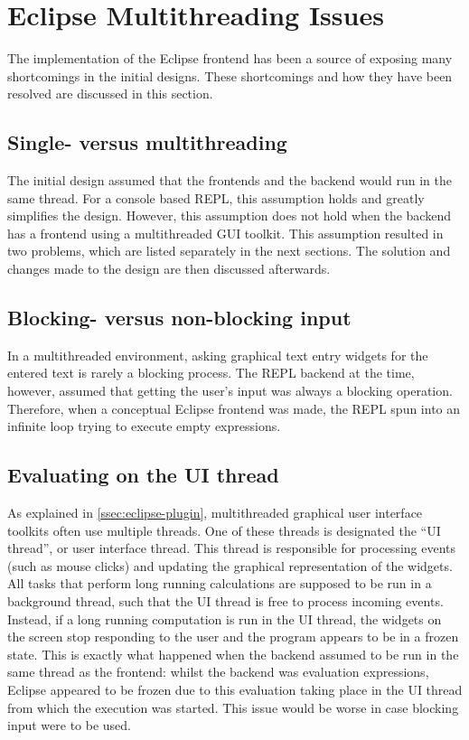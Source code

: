 \section{Eclipse Multithreading Issues}
\label{sec:eclipse-multithread}

The implementation of the Eclipse frontend has been a source of exposing many
shortcomings in the initial designs. These shortcomings and how they have been
resolved are discussed in this section.

\subsection{Single- versus multithreading}

The initial design assumed that the frontends and the backend would run in the
same thread. For a console based REPL, this assumption holds and greatly
simplifies the design. However, this assumption does not hold when the backend
has a frontend using a multithreaded GUI toolkit. This
assumption resulted in two problems, which are listed separately in the next
sections. The solution and changes made to the design are then discussed
afterwards.

\subsection{Blocking- versus non-blocking input}

In a multithreaded environment, asking graphical text entry widgets for the
entered text is rarely a blocking process. The REPL backend at the time,
however, assumed that getting the user's input was always a blocking operation.
Therefore, when a conceptual Eclipse frontend was made, the REPL spun into an
infinite loop trying to execute empty expressions.

\subsection{Evaluating on the UI thread}

As explained in \cref{ssec:eclipse-plugin}, multithreaded graphical user
interface toolkits often use multiple threads. One of these threads is
designated the ``UI thread'', or user interface thread. This thread is
responsible for processing events (such as mouse clicks) and updating the
graphical representation of the widgets. All tasks that perform long running
calculations are supposed to be run in a background thread, such that the UI
thread is free to process incoming events. Instead, if a long running
computation is run in the UI thread, the widgets on the screen stop responding
to the user and the program appears to be in a frozen state. This is exactly
what happened when the backend assumed to be run in the same thread as the
frontend: whilst the backend was evaluation expressions, Eclipse appeared to be
frozen due to this evaluation taking place in the UI thread from which the
execution was started. This issue would be worse in case blocking input
were to be used.

